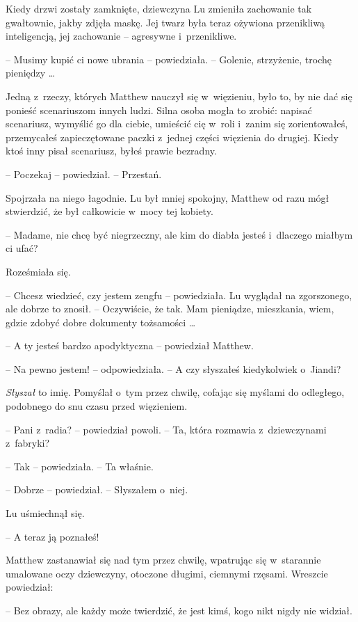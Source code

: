 \documentclass[oneside,polish,11pt,rmheadings]{mwbk}
\begin{document}
Kiedy drzwi zostały zamknięte, dziewczyna Lu zmieniła zachowanie tak gwałtownie, jakby zdjęła maskę. Jej twarz była teraz ożywiona przenikliwą inteligencją, jej zachowanie -- agresywne i~przenikliwe. 

-- Musimy kupić ci nowe ubrania -- powiedziała. -- Golenie, strzyżenie, trochę pieniędzy \ldots 

Jedną z~rzeczy, których Matthew nauczył się w~więzieniu, było to, by nie dać się ponieść scenariuszom innych ludzi. Silna osoba mogła to zrobić: napisać scenariusz, wymyślić go dla ciebie, umieścić cię w~roli i~zanim się zorientowałeś, przemycałeś zapieczętowane paczki z~jednej części więzienia do drugiej. Kiedy ktoś inny pisał scenariusz, byłeś prawie bezradny.

-- Poczekaj -- powiedział. -- Przestań.

Spojrzała na niego łagodnie. Lu był mniej spokojny, Matthew od razu mógł stwierdzić, że był całkowicie w~mocy tej kobiety. 

-- Madame, nie chcę być niegrzeczny, ale kim do diabła jesteś i~dlaczego miałbym ci ufać?

Roześmiała się. 

-- Chcesz wiedzieć, czy jestem zengfu -- powiedziała. Lu wyglądał na zgorszonego, ale dobrze to znosił. -- Oczywiście, że tak. Mam pieniądze, mieszkania, wiem, gdzie zdobyć dobre dokumenty tożsamości \ldots 

-- A ty jesteś bardzo apodyktyczna -- powiedział Matthew. 

-- Na pewno jestem! -- odpowiedziała. -- A czy słyszałeś kiedykolwiek o~Jiandi? 

\textit{Słyszał }to imię. Pomyślał o~tym przez chwilę, cofając się myślami do odległego, podobnego do snu czasu przed więzieniem. 

-- Pani z~radia? -- powiedział powoli. -- Ta, która rozmawia z~dziewczynami z~fabryki?

-- Tak -- powiedziała. -- Ta właśnie.

-- Dobrze -- powiedział. -- Słyszałem o~niej.

Lu uśmiechnął się. 

-- A teraz ją poznałeś!

Matthew zastanawiał się nad tym przez chwilę, wpatrując się w~starannie umalowane oczy dziewczyny, otoczone długimi, ciemnymi rzęsami. Wreszcie powiedział: 

-- Bez obrazy, ale każdy może twierdzić, że jest kimś, kogo nikt nigdy nie widział.
\end{document}
